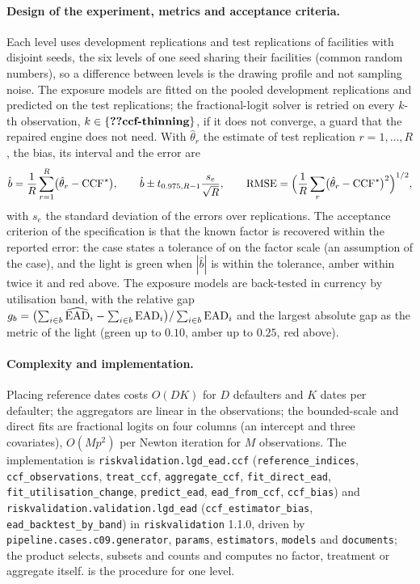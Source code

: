 \paragraph{Design of the experiment, metrics and acceptance criteria.} Each level uses  development replications and  test replications of  facilities with disjoint seeds, the six levels of one seed sharing their facilities (common random numbers), so a difference between levels is the drawing profile and not sampling noise. The exposure models are fitted on the pooled development replications and predicted on the test replications; the fractional-logit solver is retried on every $k$-th observation, $k\in\{\LE{ccf-thinning}\}$, if it does not converge, a guard that the repaired engine does not need. With $\hat\theta_r$ the estimate of test replication $r=1,\dots,R$, the bias, its interval and the error are
\begin{equation}
\hat b=\frac1R\sum_{r=1}^{R}\bigl(\hat\theta_r-\mathrm{CCF}^{\star}\bigr),\qquad \hat b\pm t_{0.975,R-1}\frac{s_e}{\sqrt R},\qquad \mathrm{RMSE}=\Bigl(\frac1R\sum_{r}\bigl(\hat\theta_r-\mathrm{CCF}^{\star}\bigr)^{2}\Bigr)^{1/2},
\label{eq:lgd-ead-bias}
\end{equation}
with $s_e$ the standard deviation of the errors over replications. The acceptance criterion of the specification is that the known factor is recovered within the reported error: the case states a tolerance of  on the factor scale (an assumption of the case), and the light is green when $|\hat b|$ is within the tolerance, amber within twice it and red above. The exposure models are back-tested in currency by utilisation band, with the relative gap $g_b=\bigl(\sum_{i\in b}\widehat{\mathrm{EAD}}_i-\sum_{i\in b}\mathrm{EAD}_i\bigr)/\sum_{i\in b}\mathrm{EAD}_i$ and the largest absolute gap as the metric of the light (green up to $0.10$, amber up to $0.25$, red above).

\paragraph{Complexity and implementation.} Placing reference dates costs $O(DK)$ for $D$ defaulters and $K$ dates per defaulter; the aggregators are linear in the observations; the bounded-scale and direct fits are fractional logits on four columns (an intercept and three covariates), $O(Mp^{2})$ per Newton iteration for $M$ observations. The implementation is \texttt{riskvalidation.lgd\_ead.ccf} (\texttt{reference\_indices}, \texttt{ccf\_observations}, \texttt{treat\_ccf}, \texttt{aggregate\_ccf}, \texttt{fit\_direct\_ead}, \texttt{fit\_utilisation\_change}, \texttt{predict\_ead}, \texttt{ead\_from\_ccf}, \texttt{ccf\_bias}) and \texttt{riskvalidation.validation.lgd\_ead} (\texttt{ccf\_estimator\_bias}, \texttt{ead\_backtest\_by\_band}) in \texttt{riskvalidation} 1.1.0, driven by \texttt{pipeline.cases.c09.generator}, \texttt{params}, \texttt{estimators}, \texttt{models} and \texttt{documents}; the product selects, subsets and counts and computes no factor, treatment or aggregate itself.  is the procedure for one level.

